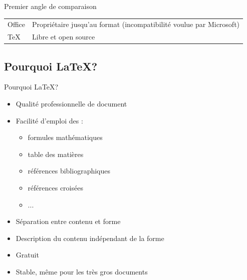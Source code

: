 \documentclass[10pt,svgnames,usenames,table]{beamer} %
\begin{document}
\begin{frame}{Premier angle de comparaison}
\begin{description}
\begin{tabular}{|lp{}|}
        \hline
        Office & Propriétaire jusqu'au format (incompatibilité
        voulue par Microsoft)\\
        \TeX & Libre et open source\\
        \hline
      \end{tabular}
  \end{description}
\end{frame}


\subsection{Pourquoi \LaTeX{}?}
\begin{frame}{Pourquoi \LaTeX{}?}

  \begin{itemize}
  	\item Qualité professionnelle de document
	\item Facilité d'emploi des :
	\begin{itemize}
		\item formules mathématiques
		\item table des matières
		\item références bibliographiques
		\item références croisées
		\item ...
	\end{itemize}
	\item Séparation entre contenu et forme
	\item Description du contenu indépendant de la forme
	\item Gratuit
	\item Stable, même pour les très gros documents
  \end{itemize}
\end{frame}
\end{document}

